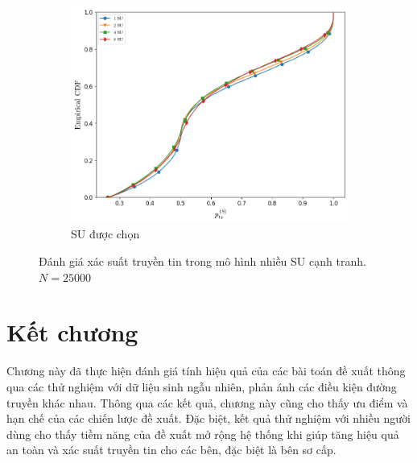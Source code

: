 \documentclass[../main.tex]{subfiles}
\begin{document}
\begin{figure}
\begin{subfigure}{.8\textwidth}
\centering
\includegraphics[width=1\linewidth]{Figures/multisus-ptxs.png}
\caption{SU được chọn}
\label{fig:Multiuser:PTXS}
\end{subfigure}

\caption{Đánh giá xác suất truyền tin trong mô hình nhiều SU cạnh tranh. $N=25000$}
\end{figure}

\section{Kết chương}

Chương này đã thực hiện đánh giá tính hiệu quả của các bài toán đề xuất thông qua các thử nghiệm với dữ liệu sinh ngẫu nhiên, phản ánh các điều kiện đường truyền khác nhau. Thông qua các kết quả, chương này cũng cho thấy ưu điểm và hạn chế của các chiến lược đề xuất. Đặc biệt, kết quả thử nghiệm với nhiều người dùng cho thấy tiềm năng của đề xuất mở rộng hệ thống khi giúp tăng hiệu quả an toàn và xác suất truyền tin cho các bên, đặc biệt là bên sơ cấp.
\end{document}
